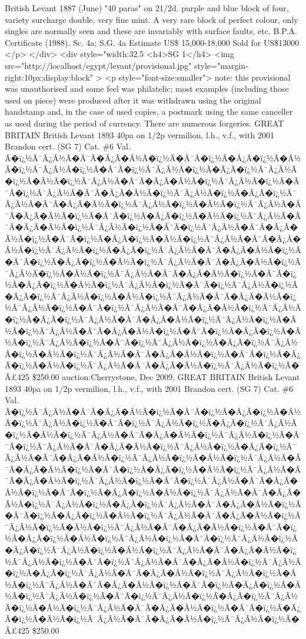 British Levant
1887 (June) "40 paras" on 21/2d. purple and blue block of four, variety surcharge double, very fine mint. A very rare block of perfect colour, only singles are normally seen and these are invariably with surface faults, etc. B.P.A. Certificate (1988). Sc. 4a; S.G. 4a
Estimate US\$ 15,000-18,000 Sold for US\$13000
</p>
</div>
<div style="width:32.5%
<h4>SG 1</h4>
<img src="http://localhost/egypt/levant/provisional.jpg" style="margin-right:10px;display:block"  >
<p style="font-size:smaller">
note: this provisional was unauthorised and some feel was philatelic; most examples (including those used on piece) were produced after it was withdrawn using the original handstamp and, in the case of used copies, a postmark using the same canceller as used during the period of currency. There are numerous forgeries.
GREAT BRITAIN British Levant 1893 40pa on 1/2p vermilion, l.h., v.f., with 2001 Brandon cert. (SG 7)		Cat. \#6
Val. Ã�ï¿½Ã¯Â¿Â½Ã�Â¯Ã�Â¿Ã�Â½Ã�ï¿½Ã�Â¯Ã�ï¿½Ã�Â¿Ã�ï¿½Ã�Â½Ã�ï¿½Ã¯Â¿Â½Ã�ï¿½Ã�Â¯Ã�ï¿½Ã¯Â¿Â½Ã�ï¿½Ã�Â¿Ã�ï¿½Ã¯Â¿Â½Ã�ï¿½Ã�Â½Ã�ï¿½Ã¯Â¿Â½Ã�Â¯Ã�Â¿Ã�Â½Ã�ï¿½Ã¯Â¿Â½Ã�ï¿½Ã�Â¯Ã�ï¿½Ã¯Â¿Â½Ã�Â¯Ã�Â¿Ã�Â½Ã�ï¿½Ã¯Â¿Â½Ã�ï¿½Ã�Â¿Ã�ï¿½Ã¯Â¿Â½Ã�Â¯Ã�Â¿Ã�Â½Ã�ï¿½Ã¯Â¿Â½Ã�ï¿½Ã�Â½Ã�ï¿½Ã¯Â¿Â½Ã�Â¯Ã�Â¿Ã�Â½Ã�ï¿½Ã�Â¯Ã�ï¿½Ã�Â¿Ã�ï¿½Ã�Â½Ã�ï¿½Ã¯Â¿Â½Ã�Â¯Ã�Â¿Ã�Â½Ã�ï¿½Ã¯Â¿Â½Ã�ï¿½Ã�Â¯Ã�ï¿½Ã¯Â¿Â½Ã�Â¯Ã�Â¿Ã�Â½Ã�ï¿½Ã�Â¯Ã�ï¿½Ã�Â¿Ã�ï¿½Ã�Â½Ã�ï¿½Ã¯Â¿Â½Ã�Â¯Ã�Â¿Ã�Â½Ã�ï¿½Ã¯Â¿Â½Ã�ï¿½Ã�Â¿Ã�ï¿½Ã¯Â¿Â½Ã�Â¯Ã�Â¿Ã�Â½Ã�ï¿½Ã�Â¯Ã�ï¿½Ã�Â¿Ã�ï¿½Ã�Â½Ã�ï¿½Ã¯Â¿Â½Ã�Â¯Ã�Â¿Ã�Â½Ã�ï¿½Ã¯Â¿Â½Ã�ï¿½Ã�Â½Ã�ï¿½Ã¯Â¿Â½Ã�Â¯Ã�Â¿Ã�Â½Ã�ï¿½Ã�Â¯Ã�ï¿½Ã�Â¿Ã�ï¿½Ã�Â½Ã�ï¿½Ã¯Â¿Â½Ã�ï¿½Ã�Â¯Ã�ï¿½Ã¯Â¿Â½Ã�ï¿½Ã�Â¿Ã�ï¿½Ã¯Â¿Â½Ã�ï¿½Ã�Â½Ã�ï¿½Ã¯Â¿Â½Ã�Â¯Ã�Â¿Ã�Â½Ã�ï¿½Ã¯Â¿Â½Ã�ï¿½Ã�Â¯Ã�ï¿½Ã¯Â¿Â½Ã�Â¯Ã�Â¿Ã�Â½Ã�ï¿½Ã¯Â¿Â½Ã�ï¿½Ã�Â¿Ã�ï¿½Ã¯Â¿Â½Ã�Â¯Ã�Â¿Ã�Â½Ã�ï¿½Ã¯Â¿Â½Ã�ï¿½Ã�Â½Ã�ï¿½Ã¯Â¿Â½Ã�Â¯Ã�Â¿Ã�Â½Ã�ï¿½Ã�Â¯Ã�ï¿½Ã�Â¿Ã�ï¿½Ã�Â½Ã�ï¿½Ã¯Â¿Â½Ã�ï¿½Ã�Â¯Ã�ï¿½Ã¯Â¿Â½Ã�ï¿½Ã�Â¿Ã�ï¿½Ã¯Â¿Â½Ã�ï¿½Ã�Â½Ã�ï¿½Ã¯Â¿Â½Ã�Â¯Ã�Â¿Ã�Â½Ã�ï¿½Ã�Â¯Ã�ï¿½Ã�Â¿Ã�ï¿½Ã�Â½Ã�ï¿½Ã¯Â¿Â½Ã�Â¯Ã�Â¿Ã�Â½Ã�ï¿½Ã¯Â¿Â½Ã�ï¿½Ã�Â£425		
\$250.00
auction:Cherrystone, Dec 2009, GREAT BRITAIN British Levant 1893 40pa on 1/2p vermilion, l.h., v.f., with 2001 Brandon cert. (SG 7)		Cat. \#6
Val. Ã�ï¿½Ã¯Â¿Â½Ã�Â¯Ã�Â¿Ã�Â½Ã�ï¿½Ã�Â¯Ã�ï¿½Ã�Â¿Ã�ï¿½Ã�Â½Ã�ï¿½Ã¯Â¿Â½Ã�ï¿½Ã�Â¯Ã�ï¿½Ã¯Â¿Â½Ã�ï¿½Ã�Â¿Ã�ï¿½Ã¯Â¿Â½Ã�ï¿½Ã�Â½Ã�ï¿½Ã¯Â¿Â½Ã�Â¯Ã�Â¿Ã�Â½Ã�ï¿½Ã¯Â¿Â½Ã�ï¿½Ã�Â¯Ã�ï¿½Ã¯Â¿Â½Ã�Â¯Ã�Â¿Ã�Â½Ã�ï¿½Ã¯Â¿Â½Ã�ï¿½Ã�Â¿Ã�ï¿½Ã¯Â¿Â½Ã�Â¯Ã�Â¿Ã�Â½Ã�ï¿½Ã¯Â¿Â½Ã�ï¿½Ã�Â½Ã�ï¿½Ã¯Â¿Â½Ã�Â¯Ã�Â¿Ã�Â½Ã�ï¿½Ã�Â¯Ã�ï¿½Ã�Â¿Ã�ï¿½Ã�Â½Ã�ï¿½Ã¯Â¿Â½Ã�Â¯Ã�Â¿Ã�Â½Ã�ï¿½Ã¯Â¿Â½Ã�ï¿½Ã�Â¯Ã�ï¿½Ã¯Â¿Â½Ã�Â¯Ã�Â¿Ã�Â½Ã�ï¿½Ã�Â¯Ã�ï¿½Ã�Â¿Ã�ï¿½Ã�Â½Ã�ï¿½Ã¯Â¿Â½Ã�Â¯Ã�Â¿Ã�Â½Ã�ï¿½Ã¯Â¿Â½Ã�ï¿½Ã�Â¿Ã�ï¿½Ã¯Â¿Â½Ã�Â¯Ã�Â¿Ã�Â½Ã�ï¿½Ã�Â¯Ã�ï¿½Ã�Â¿Ã�ï¿½Ã�Â½Ã�ï¿½Ã¯Â¿Â½Ã�Â¯Ã�Â¿Ã�Â½Ã�ï¿½Ã¯Â¿Â½Ã�ï¿½Ã�Â½Ã�ï¿½Ã¯Â¿Â½Ã�Â¯Ã�Â¿Ã�Â½Ã�ï¿½Ã�Â¯Ã�ï¿½Ã�Â¿Ã�ï¿½Ã�Â½Ã�ï¿½Ã¯Â¿Â½Ã�ï¿½Ã�Â¯Ã�ï¿½Ã¯Â¿Â½Ã�ï¿½Ã�Â¿Ã�ï¿½Ã¯Â¿Â½Ã�ï¿½Ã�Â½Ã�ï¿½Ã¯Â¿Â½Ã�Â¯Ã�Â¿Ã�Â½Ã�ï¿½Ã¯Â¿Â½Ã�ï¿½Ã�Â¯Ã�ï¿½Ã¯Â¿Â½Ã�Â¯Ã�Â¿Ã�Â½Ã�ï¿½Ã¯Â¿Â½Ã�ï¿½Ã�Â¿Ã�ï¿½Ã¯Â¿Â½Ã�Â¯Ã�Â¿Ã�Â½Ã�ï¿½Ã¯Â¿Â½Ã�ï¿½Ã�Â½Ã�ï¿½Ã¯Â¿Â½Ã�Â¯Ã�Â¿Ã�Â½Ã�ï¿½Ã�Â¯Ã�ï¿½Ã�Â¿Ã�ï¿½Ã�Â½Ã�ï¿½Ã¯Â¿Â½Ã�ï¿½Ã�Â¯Ã�ï¿½Ã¯Â¿Â½Ã�ï¿½Ã�Â¿Ã�ï¿½Ã¯Â¿Â½Ã�ï¿½Ã�Â½Ã�ï¿½Ã¯Â¿Â½Ã�Â¯Ã�Â¿Ã�Â½Ã�ï¿½Ã�Â¯Ã�ï¿½Ã�Â¿Ã�ï¿½Ã�Â½Ã�ï¿½Ã¯Â¿Â½Ã�Â¯Ã�Â¿Ã�Â½Ã�ï¿½Ã¯Â¿Â½Ã�ï¿½Ã�Â£425		
\$250.00

